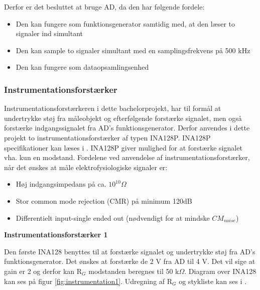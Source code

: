 Derfor er det besluttet at bruge AD, da den har følgende fordele:
\begin{itemize}
\item Den kan fungere som funktionsgenerator samtidig med, at den læser to signaler ind simultant
\item Den kan sample to signaler simultant med en samplingsfrekvens på 500 kHz
\item Den kan fungere som dataopsamlingsenhed
\end{itemize}



\subsubsection{Instrumentationsforstærker}

Instrumentationsforstærkeren i dette bachelorprojekt, har til formål at undertrykke støj fra måleobjekt og efterfølgende forstærke signalet, men også forstærke indgangssignalet fra AD's funktionsgenerator. Derfor anvendes i dette
projekt to instrumentationsforstærker af typen INA128P. INA128P specifikationer kan læses i . INA128P giver mulighed for at forstærke signalet vha. kun en modstand. Fordelene ved anvendelse af instrumentationsforstærker, når det ønskes at måle elektrofysiologiske signaler er\cite{PeterJohansen2014}:
\begin{itemize}
\item 	Høj indgangsimpedans på ca. $10^{10} \Omega $
\item	Stor common mode rejection (CMR) på minimum 120dB
\item 	Differentielt input-single ended out (nødvendigt for at mindske $CM_{noise}$)
\end{itemize}



\textbf{Instrumentationsforstærker 1}

Den første INA128 benyttes til at forstærke signalet og undertrykke støj fra AD's funktionsgenerator. Det ønskes at forstærke de 2 V fra AD til 4 V. Det vil sige at gain er 2 og derfor kan R$_{G}$ modstanden beregnes til 50 k$\Omega$. Diagram over INA128 kan ses på figur \ref{fig:instrumentation1}. Udregning af R$_{G}$ og stykliste kan ses i .


